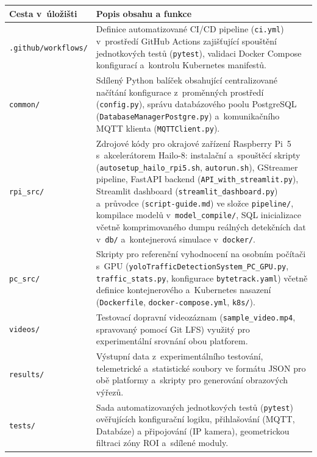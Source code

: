 \begin{table}[H]
    \centering
    \renewcommand{\arraystretch}{1.2}
    \begin{tabular}{|l|p{12.6cm}|}
        \hline
        \textbf{Cesta v~úložišti} & \textbf{Popis obsahu a funkce} \\ \hline
        \texttt{.github/workflows/} & Definice automatizované CI/CD pipeline (\texttt{ci.yml}) v~prostředí GitHub Actions zajišťující spouštění jednotkových testů (\texttt{pytest}), validaci Docker Compose konfigurací a~kontrolu Kubernetes manifestů. \\ \hline
        \texttt{common/} & Sdílený Python balíček obsahující centralizované načítání konfigurace z~proměnných prostředí (\texttt{config.py}), správu databázového poolu PostgreSQL (\texttt{DatabaseManagerPostgre.py}) a~komunikačního \acs{MQTT} klienta (\texttt{MQTTClient.py}). \\ \hline
        \texttt{rpi\_src/} & Zdrojové kódy pro okrajové zařízení Raspberry Pi~5 s~akcelerátorem Hailo-8: instalační a~spouštěcí skripty 
        (\texttt{autosetup\_hailo\_rpi5.sh}, \texttt{autorun.sh}), GStreamer pipeline, FastAPI backend (\texttt{API\_with\_streamlit.py}), Streamlit dashboard (\texttt{streamlit\_dashboard.py}) a~průvodce (\texttt{script-guide.md}) ve složce \texttt{pipeline/}, kompilace modelů v~\texttt{model\_compile/}, \acs{SQL} inicializace včetně komprimovaného dumpu reálných detekčních dat v~\texttt{db/} a~kontejnerová simulace v~\texttt{docker/}. \\ \hline
        \texttt{pc\_src/} & Skripty pro referenční vyhodnocení na osobním počítači s~\acs{GPU} (\texttt{yoloTrafficDetectionSystem\_PC\_GPU.py}, \texttt{traffic\_stats.py}, konfigurace \texttt{bytetrack.yaml}) včetně definice kontejnerového a~Kubernetes nasazení (\texttt{Dockerfile}, \texttt{docker-compose.yml}, \texttt{k8s/}). \\ \hline
        \texttt{videos/} & Testovací dopravní videozáznam (\texttt{sample\_video.mp4}, spravovaný pomocí Git LFS) využitý pro experimentální srovnání obou platforem. \\ \hline
        \texttt{results/} & Výstupní data z~experimentálního testování, telemetrické a~statistické soubory ve formátu \acs{JSON} pro obě platformy a~skripty pro generování obrazových výřezů. \\ \hline
        \texttt{tests/} & Sada automatizovaných jednotkových testů (\texttt{pytest}) ověřujících konfigurační logiku, přihlašování (MQTT, Databáze) a připojování (IP kamera), geometrickou filtraci zóny \acs{ROI} a~sdílené moduly. \\ \hline

\end{tabular}
\end{table}
